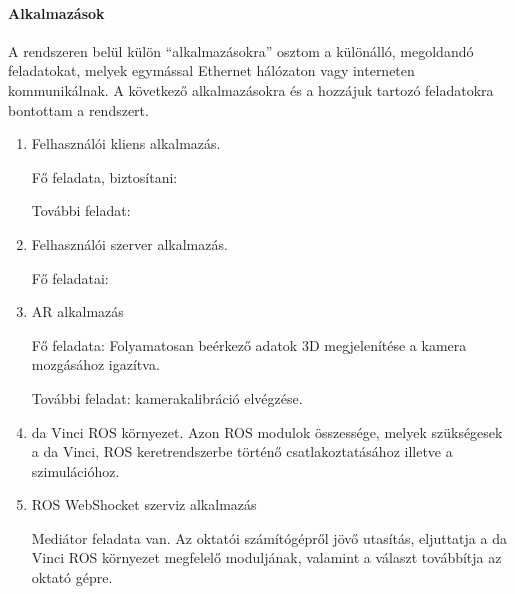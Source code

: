 \documentclass[12pt,a4paper,oneside]{report} %
\begin{document}
\paragraph{Alkalmazások}
A rendszeren belül külön ``alkalmazásokra'' osztom a különálló, megoldandó feladatokat, melyek egymással Ethernet hálózaton vagy interneten kommunikálnak.
A következő alkalmazásokra és a hozzájuk  tartozó feladatokra bontottam a rendszert.
\begin{enumerate}
	\item Felhasználói kliens alkalmazás.
	\par Fő feladata, biztosítani: 
	\par További feladat:
	
	
	\item Felhasználói szerver alkalmazás.
	\par Fő feladatai:
	
	\item AR alkalmazás
	\par Fő feladata: Folyamatosan beérkező adatok 3D megjelenítése a kamera mozgásához igazítva.
	\par További feladat: kamerakalibráció elvégzése.
	
	\item da Vinci ROS környezet. Azon ROS modulok összessége, melyek szükségesek a da Vinci, ROS keretrendszerbe történő csatlakoztatásához illetve a szimulációhoz.
	
	\item ROS WebShocket szerviz alkalmazás
	\par Mediátor feladata van. Az oktatói számítógépről jövő utasítás, eljuttatja  a da Vinci ROS környezet megfelelő moduljának, valamint a választ továbbítja az oktató gépre.
\end{enumerate}
\end{document}
